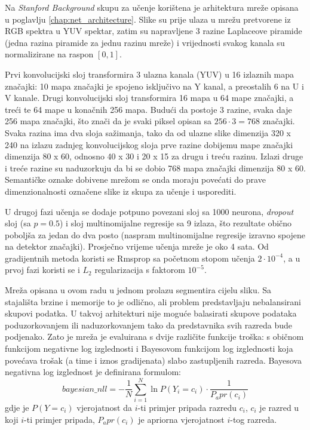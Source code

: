 \documentclass[times, utf8, diplomski, numeric]{fer}
\begin{document}
Na \textit{Stanford Background} skupu za učenje korištena je arhitektura mreže opisana u poglavlju \ref{chap:net_architecture}. Slike su prije ulaza u mrežu pretvorene iz RGB spektra u YUV spektar, zatim su napravljene 3 razine Laplaceove piramide (jedna razina piramide za jednu razinu mreže) i vrijednosti svakog kanala su normalizirane na raspon $\left[ 0, 1 \right]$.

Prvi konvolucijski sloj transformira 3 ulazna kanala (YUV) u 16 izlaznih mapa značajki: 10 mapa značajki je spojeno isključivo na Y kanal, a preostalih 6 na U i V kanale. Drugi konvolucijski sloj transformira 16 mapa u 64 mape značajki, a treći te 64 mape u konačnih 256 mapa. Budući da postoje 3 razine, svaka daje 256 mapa značajki, što znači da je svaki piksel opisan sa $256 \cdot 3 = 768$ značajki. Svaka razina ima dva sloja sažimanja, tako da od ulazne slike dimenzija 320 x 240 na izlazu zadnjeg konvolucijskog sloja prve razine dobijemu mape značajki dimenzija 80 x 60, odnosno 40 x 30 i 20 x 15 za drugu i treću razinu. Izlazi druge i treće razine su naduzorkuju da bi se dobio 768 mapa značajki dimenzija 80 x 60. Semantičke oznake dobivene mrežom se onda moraju povećati do prave dimenzionalnosti označene slike iz skupa za učenje i usporediti.

U drugoj fazi učenja se dodaje potpuno povezani sloj sa 1000 neurona, \textit{dropout} sloj (sa $p=0.5$) i sloj multinomijalne regresije sa 9 izlaza, što rezultate obično poboljša za jedan do dva posto (naspram multinomijalne regresije izravno spojene na detektor značajki). Prosječno vrijeme učenja mreže je oko 4 sata. Od gradijentnih metoda koristi se Rmsprop sa početnom stopom učenja $2 \cdot 10^{-4}$, a u prvoj fazi koristi se i $L_2$ regularizacija s faktorom $10^{-5}$.

Mreža opisana u ovom radu u jednom prolazu segmentira cijelu sliku. Sa stajališta brzine i memorije to je odlično, ali problem predstavljaju nebalansirani skupovi podatka. U takvoj arhitekturi nije moguće balasirati skupove podataka poduzorkovanjem ili naduzorkovanjem tako da predstavnika svih razreda bude podjenako. Zato je mreža je evaluirana s dvije različite funkcije troška: s običnom funkcijom negativne log izglednosti i Bayesovom funkcijom log izglednosti\cite{daylac} koja povećava trošak (a time i iznos gradijenata) slabo zastupljenih razreda. Bayesova negativna log izglednost je definirana formulom:
\begin{equation}
  bayesian\_nll = - \frac{1}{N} \sum_{i=1}^{N} \ln P(Y_i = c_i) \cdot \frac{1}{P_apr(c_i)}
\end{equation}
gdje je $P(Y = c_i)$ vjerojatnost da $i$-ti primjer pripada razredu $c_i$, $c_i$ je razred u koji $i$-ti primjer pripada, $P_apr(c_i)$ je apriorna vjerojatnost $i$-tog razreda.
\end{document}
